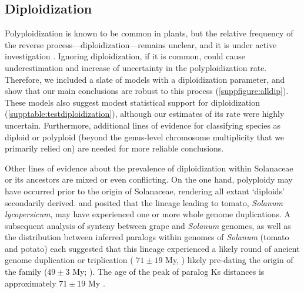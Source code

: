 
\subsection*{Diploidization}

Polyploidization is known to be common in plants, but the relative frequency of the reverse process---diploidization---remains unclear, and it is under active investigation \citep{dodsworth_2015,mandakova_2018}.
%
Ignoring diploidization, if it is common, could cause underestimation and increase of uncertainty in  the polyploidization rate. 
Therefore, we included a slate of models with a diploidization parameter, and show that our main conclusions are robust to this process (\cref{suppfigure:alldip}).
These models also suggest modest statistical support for diploidization (\cref{supptable:testdiploidization}), although our estimates of its rate were highly uncertain. 
Furthermore, additional lines of evidence for classifying species as diploid or polyploid (beyond the genus-level chromosome multiplicity that we primarily relied on) are needed for more reliable conclusions.

Other lines of evidence about the prevalence of diploidization within Solanaceae or its ancestors are mixed or even conflicting.
On the one hand, polyploidy may have occurred prior to the origin of Solanaceae, rendering all extant `diploids' secondarily derived.
 and \citet{blanc2004} posited that the lineage leading to tomato, \emph{Solanum lycopersicum}, may have experienced one or more whole genome duplications.
A subsequent analysis of synteny between grape and \emph{Solanum} genomes, as well as the distribution between inferred paralogs within genomes of \emph{Solanum} (tomato and potato) each suggested that this lineage experienced a likely round of ancient genome duplication or triplication ( $71 \pm 19$ My, \citet{tomato2012})  likely pre-dating the origin of the family ($49 \pm 3$ My; \citealt{sarkinen_2013}). 
The age of the peak of paralog Ks distances is approximately $71 \pm 19$ My \citep{tomato2012}. 


